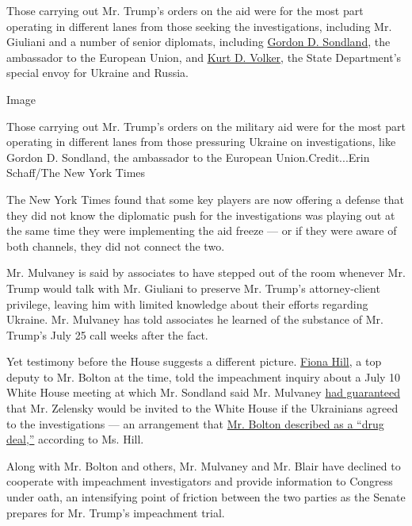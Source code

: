 Those carrying out Mr. Trump's orders on the aid were for the most part
operating in different lanes from those seeking the investigations,
including Mr. Giuliani and a number of senior diplomats, including
\href{https://www.nytimes.com/2019/11/20/us/politics/sondland-statement.html}{Gordon
D. Sondland}, the ambassador to the European Union, and
\href{https://www.nytimes.com/2019/11/19/us/politics/kurt-volker.html}{Kurt
D. Volker}, the State Department's special envoy for Ukraine and Russia.

Image

Those carrying out Mr. Trump's orders on the military aid were for the
most part operating in different lanes from those pressuring Ukraine on
investigations, like Gordon D. Sondland, the ambassador to the European
Union.Credit...Erin Schaff/The New York Times

The New York Times found that some key players are now offering a
defense that they did not know the diplomatic push for the
investigations was playing out at the same time they were implementing
the aid freeze --- or if they were aware of both channels, they did not
connect the two.

Mr. Mulvaney is said by associates to have stepped out of the room
whenever Mr. Trump would talk with Mr. Giuliani to preserve Mr. Trump's
attorney-client privilege, leaving him with limited knowledge about
their efforts regarding Ukraine. Mr. Mulvaney has told associates he
learned of the substance of Mr. Trump's July 25 call weeks after the
fact.

Yet testimony before the House suggests a different picture.
\href{https://www.nytimes.com/2019/11/21/us/politics/who-is-fiona-hill.html}{Fiona
Hill}, a top deputy to Mr. Bolton at the time, told the impeachment
inquiry about a July 10 White House meeting at which Mr. Sondland said
Mr. Mulvaney
\href{https://www.documentcloud.org/documents/6593529-2019-10-14-Fiona-Hill-Deposition.html\#document/p129/a541489}{had
guaranteed} that Mr. Zelensky would be invited to the White House if the
Ukrainians agreed to the investigations --- an arrangement that
\href{https://www.nytimes.com/2019/11/11/us/ukraine-trump.html}{Mr.
Bolton described as a ``drug deal,''} according to Ms. Hill.

Along with Mr. Bolton and others, Mr. Mulvaney and Mr. Blair have
declined to cooperate with impeachment investigators and provide
information to Congress under oath, an intensifying point of friction
between the two parties as the Senate prepares for Mr. Trump's
impeachment trial.

